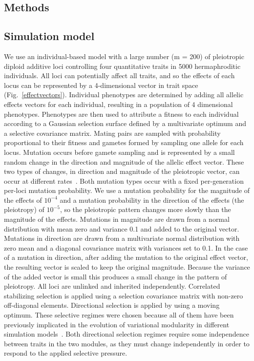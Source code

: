 \begin{refsection}
\section{Methods}

\subsection{Simulation model}

We use an individual-based model with a large number (m = 200) of pleiotropic
diploid additive loci controlling four quantitative traits in 5000
hermaphroditic individuals. All loci can potentially affect all traits, and so
the effects of each locus can be represented by a 4-dimensional vector in
trait space (Fig.~\ref{effectvectors}). Individual phenotypes are determined
by adding all allelic effects vectors for each individual, resulting in a
population of 4 dimensional phenotypes. Phenotypes are then used to attribute
a fitness to each individual according to a Gaussian selection surface defined
by a multivariate optimum and a selective covariance matrix. Mating pairs are
sampled with probability proportional to their fitness and gametes formed by
sampling one allele for each locus. Mutation occurs before gamete sampling and
is represented by a small random change in the direction and magnitude of the
allelic effect vector. These two types of changes, in direction and magnitude
of the pleiotropic vector, can occur at different rates~\parencite[for a
discussion on both types of mutations see][]{Draghi2010-ye}. Both mutation
types occur with a fixed per-generation per-loci mutation probability. We use
a mutation probability for the magnitude of the effects of $10^{-4}$ and a
mutation probability in the direction of the effects (the pleiotropy) of
$10^{-5}$, so the pleiotropic pattern changes more slowly than the magnitude
of the effects. Mutations in magnitude are drawn from a normal distribution
with mean zero and variance 0.1 and added to the original vector. Mutations in
direction are drawn from a multivariate normal distribution with zero mean and
a diagonal covariance matrix with variances set to 0.1. In the case of a
mutation in direction, after adding the mutation to the original effect
vector, the resulting vector is scaled to keep the original magnitude. Because the
variance of the added vector is small this produces a small change in the
pattern of pleiotropy. All loci are unlinked and inherited independently.
Correlated stabilizing selection is applied using a selection covariance
matrix with non-zero off-diagonal elements. Directional selection is applied
by using a moving optimum. These selective regimes were chosen because all of
them have been previously implicated in the evolution of variational
modularity in different simulation models~\parencite{Jones2014-wj,
Melo2015-bk}. Both directional selection regimes require some independence
between traits in the two modules, as they must change independently in order
to respond to the applied selective pressure.


\end{refsection}
